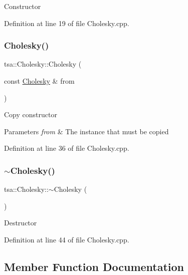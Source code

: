 Constructor 

Definition at line 19 of file Cholesky.\+cpp.

\mbox{\label{classtsa_1_1_cholesky_a86a264d92076daba27859959741b3627}} 
\subsubsection{\texorpdfstring{Cholesky()}{Cholesky()}\hspace{0.1cm}{\footnotesize\ttfamily [2/2]}}
{\footnotesize\ttfamily tsa\+::\+Cholesky\+::\+Cholesky (\begin{DoxyParamCaption}\item[{const \hyperlink{classtsa_1_1_cholesky}{Cholesky} \&}]{from }\end{DoxyParamCaption})}

Copy constructor


\begin{DoxyParams}{Parameters}
{\em from} & The instance that must be copied \\
\hline
\end{DoxyParams}


Definition at line 36 of file Cholesky.\+cpp.

\mbox{\label{classtsa_1_1_cholesky_a45d30ca313f3949504716bacb5036b6d}} 
\subsubsection{\texorpdfstring{$\sim$\+Cholesky()}{~Cholesky()}}
{\footnotesize\ttfamily tsa\+::\+Cholesky\+::$\sim$\+Cholesky (\begin{DoxyParamCaption}{ }\end{DoxyParamCaption})}

Destructor 

Definition at line 44 of file Cholesky.\+cpp.



\subsection{Member Function Documentation}
\mbox{\label{classtsa_1_1_cholesky_ac04746ca67f2fb532dc060a35a1ba4d8}} 
